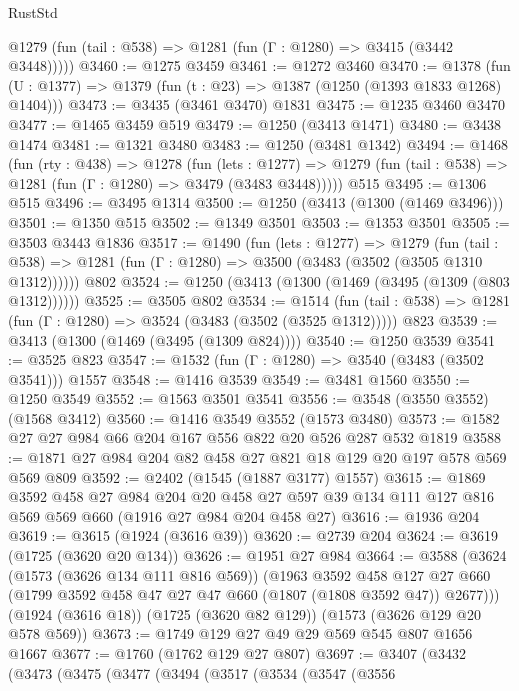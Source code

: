 \begin{lexlean}{RustStd}
\begin{coremodule}
      @1279 (fun (tail : @538) => @1281 (fun (Γ : @1280) => @3415 (@3442 @3448)))))
@3460 := @1275 @3459
@3461 := @1272 @3460
@3470 := @1378 (fun (U : @1377) => @1379 (fun (t : @23) => @1387 (@1250 (@1393 @1833 @1268) @1404)))
@3473 := @3435 (@3461 @3470) @1831
@3475 := @1235 @3460 @3470
@3477 := @1465 @3459 @519
@3479 := @1250 (@3413 @1471)
@3480 := @3438 @1474
@3481 := @1321 @3480
@3483 := @1250 (@3481 @1342)
@3494 := @1468
    (fun (rty : @438) =>
    @1278
      (fun (lets : @1277) =>
      @1279 (fun (tail : @538) => @1281 (fun (Γ : @1280) => @3479 (@3483 @3448)))))
    @515
@3495 := @1306 @515
@3496 := @3495 @1314
@3500 := @1250 (@3413 (@1300 (@1469 @3496)))
@3501 := @1350 @515
@3502 := @1349 @3501
@3503 := @1353 @3501
@3505 := @3503 @3443 @1836
@3517 := @1490
    (fun (lets : @1277) =>
    @1279
      (fun (tail : @538) => @1281 (fun (Γ : @1280) => @3500 (@3483 (@3502 (@3505 @1310 @1312))))))
    @802
@3524 := @1250 (@3413 (@1300 (@1469 (@3495 (@1309 (@803 @1312))))))
@3525 := @3505 @802
@3534 := @1514
    (fun (tail : @538) => @1281 (fun (Γ : @1280) => @3524 (@3483 (@3502 (@3525 @1312)))))
    @823
@3539 := @3413 (@1300 (@1469 (@3495 (@1309 @824))))
@3540 := @1250 @3539
@3541 := @3525 @823
@3547 := @1532 (fun (Γ : @1280) => @3540 (@3483 (@3502 @3541))) @1557
@3548 := @1416 @3539
@3549 := @3481 @1560
@3550 := @1250 @3549
@3552 := @1563 @3501 @3541
@3556 := @3548 (@3550 @3552) (@1568 @3412)
@3560 := @1416 @3549 @3552 (@1573 @3480)
@3573 := @1582 @27 @27 @984 @66 @204 @167 @556 @822 @20 @526 @287 @532 @1819
@3588 := @1871 @27 @984 @204 @82 @458 @27 @821 @18 @129 @20 @197 @578 @569 @569 @809
@3592 := @2402 (@1545 (@1887 @3177) @1557)
@3615 := @1869
    @3592
    @458
    @27
    @984
    @204
    @20
    @458
    @27
    @597
    @39
    @134
    @111
    @127
    @816
    @569
    @569
    @660
    (@1916 @27 @984 @204 @458 @27)
@3616 := @1936 @204
@3619 := @3615 (@1924 (@3616 @39))
@3620 := @2739 @204
@3624 := @3619 (@1725 (@3620 @20 @134))
@3626 := @1951 @27 @984
@3664 := @3588
    (@3624
      (@1573 (@3626 @134 @111 @816 @569))
      (@1963
        @3592
        @458
        @127
        @27
        @660
        (@1799 @3592 @458 @47 @27 @47 @660 (@1807 (@1808 @3592 @47)) @2677)))
    (@1924 (@3616 @18))
    (@1725 (@3620 @82 @129))
    (@1573 (@3626 @129 @20 @578 @569))
@3673 := @1749 @129 @27 @49 @29 @569 @545 @807 @1656 @1667
@3677 := @1760 (@1762 @129 @27 @807)
@3697 := @3407
    (@3432
      (@3473
        (@3475
          (@3477
            (@3494
              (@3517
                (@3534
                  (@3547
                    (@3556

\end{coremodule}
\end{lexlean}
